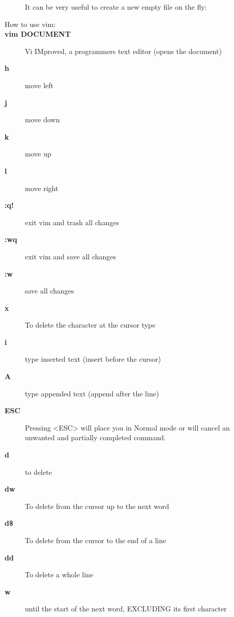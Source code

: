 \documentclass[10pt,a4paper]{scrartcl}
\begin{document}
\begin{description}
    It can be very useful to create a new empty file on the fly:






\item[\large{How to use vim:}]

\item[\bf{vim DOCUMENT}] Vi IMproved, a programmers text editor (opens the document)

\item[\bf{h}] move left

\item[\bf{j}] move down

\item[\bf{k}] move up

\item[\bf{l}] move right

\item[\bf{:q!}] exit vim and trash all changes

\item[\bf{:wq}] exit vim and save all changes

\item[\bf{:w}] save all changes

\item[\bf{x}] To delete the character at the cursor type

\item[\bf{i}] type inserted text (insert before the cursor)

\item[\bf{A}] type appended text (append after the line)

\item[\bf{ESC}]  Pressing <ESC> will place you in Normal mode or will cancel
      an unwanted and partially completed command.

\item[\bf{d}] to delete

\item[\bf{dw}] To delete from the cursor up to the next word

\item[\bf{d\$}] To delete from the cursor to the end of a line

\item[\bf{dd}] To delete a whole line

\item[\bf{w}] until the start of the next word, EXCLUDING its first character


\end{description}
\end{document}
